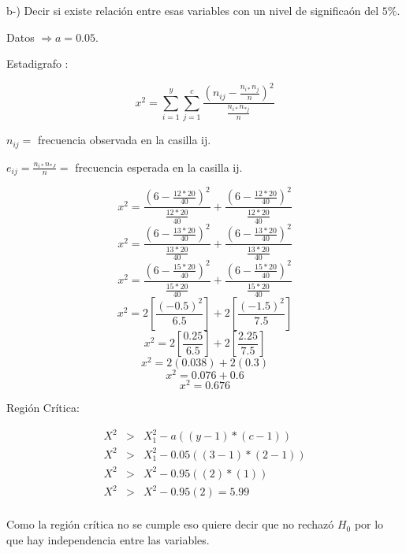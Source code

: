 \documentclass{article}
\begin{document}
		\begin{flushleft}
			b-) Decir si existe relaci\'on entre esas variables con un nivel de significa\'on del $5\%$.
		\end{flushleft}
		\begin{flushleft}
			Datos $\Rightarrow a = 0.05$.
		\end{flushleft}
		\begin{flushleft}
			Estadigrafo :
		\end{flushleft}
		$$ x^2 = \sum_{i=1}^{y}\sum_{j=1}^{c}\frac{\left(n_{ij} - \frac{n_{i*}n_{j}}{n}\right)^2}{\frac{n_{i*}n_{*j}}{n}}$$
		\begin{flushleft}
			$n_{ij} =$ frecuencia observada en la casilla ij.
		\end{flushleft}
		\begin{flushleft}
			$e_{ij} = \frac{n_{i*}n_{*J}}{n} =$ frecuencia esperada en la casilla ij.
		\end{flushleft}
		$$x^2 = \frac{\left(6 - \frac{12 * 20}{40}\right)^2}{\frac{12 * 20}{40}} + \frac{\left(6 - \frac{12 * 20}{40}\right)^2}{\frac{12 * 20}{40}}$$
		$$x^2 = \frac{\left(6 - \frac{13 * 20}{40}\right)^2}{\frac{13 * 20}{40}} + \frac{\left(6 - \frac{13 * 20}{40}\right)^2}{\frac{13 * 20}{40}}$$
		$$x^2 = \frac{\left(6 - \frac{15 * 20}{40}\right)^2}{\frac{15 * 20}{40}} + \frac{\left(6 - \frac{15 * 20}{40}\right)^2}{\frac{15 * 20}{40}}$$
		$$x^2 = 2\left[\frac{\left(-0.5\right)^2}{6.5}\right] + 2\left[\frac{\left(-1.5\right)^2}{7.5}\right]$$
		$$x^2 = 2\left[\frac{0.25}{6.5}\right] + 2\left[\frac{2.25}{7.5}\right]$$
		$$x^2 = 2\left(0.038\right) + 2\left(0.3\right)$$
		$$x^2 = 0.076 + 0.6$$
		$$x^2 = 0.676$$

		\begin{flushleft}
			Regi\'on Cr\'itica:
		\end{flushleft}
		\begin{equation*}    
		\begin{array}{lcl}
			X^2 & > & X_{1}^{2} - a \left(\left(y-1\right)*\left(c-1\right)\right)\\
			X^2 & > & X_{1}^{2} - 0.05 \left(\left(3-1\right)*\left(2-1\right)\right)\\
			X^2 & > & X^{2} - 0.95 \left(\left(2\right)*\left(1\right)\right)\\
			X^2 & > & X^{2} - 0.95 \left(2\right) = 5.99\\
		\end{array}
		\end{equation*}

		\begin{flushleft}
			Como la regi\'on cr\'itica no se cumple eso quiere decir que no rechaz\'o $H_{0}$ por lo que hay independencia entre las variables.
		\end{flushleft}
\end{document}
